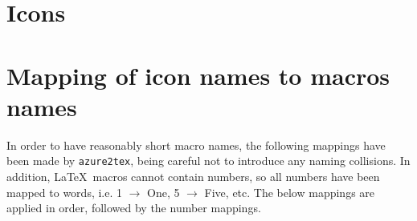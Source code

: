 \documentclass[12pt]{article}
\begin{document}
\newpage
\section{Icons}

\setlength{\parindent}{0pt}

\begin{multicols}{2}\footnotesize

  

\end{multicols}\clearpage

\normalsize

\appendix
\section{Mapping of icon names to macros names}
In order to have reasonably short macro names, the following mappings have been made by \texttt{azure2tex}, being careful not to introduce any naming collisions.
In addition, \LaTeX\ macros cannot contain numbers, so all numbers have been mapped to words, i.e. 1 $\rightarrow$ One, 5 $\rightarrow$ Five, etc.
The below mappings are applied in order, followed by the number mappings.
\end{document}
